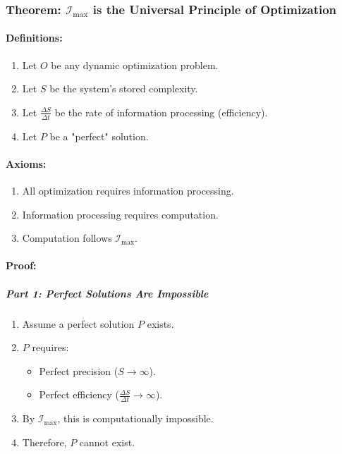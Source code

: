 \documentclass[12pt]{article}
\begin{document}
\subsubsection{Theorem: \(\mathcal{I}_{\text{max}}\) is the Universal Principle of Optimization}

\paragraph{Definitions:}
\begin{enumerate}
    \item Let \(O\) be any dynamic optimization problem.
    \item Let \(S\) be the system's stored complexity.
    \item Let \(\frac{\Delta S}{\Delta t}\) be the rate of information processing (efficiency).
    \item Let \(P\) be a "perfect" solution.
\end{enumerate}

\paragraph{Axioms:}
\begin{enumerate}
    \item All optimization requires information processing.
    \item Information processing requires computation.
    \item Computation follows \(\mathcal{I}_{\text{max}}\).
\end{enumerate}

\paragraph{Proof:}

\subparagraph{Part 1: Perfect Solutions Are Impossible}
\begin{enumerate}
    \item Assume a perfect solution \(P\) exists.
    \item \(P\) requires:
    \begin{itemize}
        \item Perfect precision (\(S \to \infty\)).
        \item Perfect efficiency (\(\frac{\Delta S}{\Delta t} \to \infty\)).
    \end{itemize}
    \item By \(\mathcal{I}_{\text{max}}\), this is computationally impossible.
    \item Therefore, \(P\) cannot exist.
\end{enumerate}
\end{document}
